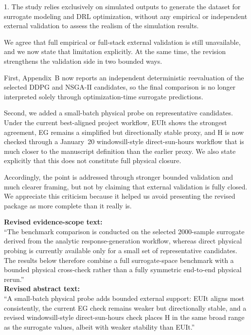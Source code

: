 \begin{ReviewerComment}
1. The study relies exclusively on simulated outputs to generate the dataset for surrogate modeling and DRL optimization, without any empirical or independent external validation to assess the realism of the simulation results.
\end{ReviewerComment}
%
\begin{Answer}
We agree that full empirical or full-stack external validation is still unavailable, and we now state that limitation explicitly. At the same time, the revision strengthens the validation side in two bounded ways.

First, Appendix~B now reports an independent deterministic reevaluation of the selected DDPG and NSGA-II candidates, so the final comparison is no longer interpreted solely through optimization-time surrogate predictions.

Second, we added a small-batch physical probe on representative candidates. Under the current best-aligned project workflow, EUIt shows the strongest agreement, EG remains a simplified but directionally stable proxy, and H is now checked through a January~20 windowsill-style direct-sun-hours workflow that is much closer to the manuscript definition than the earlier proxy. We also state explicitly that this does not constitute full physical closure.

Accordingly, the point is addressed through stronger bounded validation and much clearer framing, but not by claiming that external validation is fully closed. We appreciate this criticism because it helped us avoid presenting the revised package as more complete than it really is.
\end{Answer}
\begin{RevisionExcerpt}
\noindent\textbf{Revised evidence-scope text:}\\
``The benchmark comparison is conducted on the selected 2000-sample surrogate derived from the analytic response-generation workflow, whereas direct physical probing is currently available only for a small set of representative candidates. The results below therefore combine a full surrogate-space benchmark with a bounded physical cross-check rather than a fully symmetric end-to-end physical rerun.''\\[0.5em]
\noindent\textbf{Revised abstract text:}\\
``A small-batch physical probe adds bounded external support: EUIt aligns most consistently, the current EG check remains weaker but directionally stable, and a revised windowsill-style direct-sun-hours check places H in the same broad range as the surrogate values, albeit with weaker stability than EUIt.''
\end{RevisionExcerpt}
